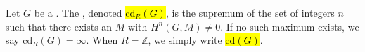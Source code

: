 \begin{definition} \label{definition:cohomological_dimension_of_a_group_over_a_ring}
Let $G$ be a . 
The , denoted \hl{$\text{cd}_R(G)$}, is the supremum of the set of integers $n$ such that there exists an  $M$ with $H^n(G, M) \neq 0$. If no such maximum exists, we say $\text{cd}_R(G) = \infty$. When $R = \mathbb{Z}$, we simply write \hl{$\text{cd}(G)$}.
\end{definition}